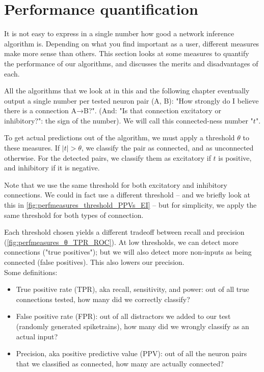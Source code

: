 \FloatBarrier
\section{Performance quantification}
\label{sec:perf_quant}

It is not easy to express in a single number how good a network inference algorithm is. Depending on what you find important as a user, different measures make more sense than others. This section looks at some measures to quantify the performance of our algorithms, and discusses the merits and disadvantages of each.

All the algorithms that we look at in this and the following chapter eventually output a single number per tested neuron pair (A, B): "How strongly do I believe there is a connection A→B?". (And: "Is that connection excitatory or inhibitory?": the sign of the number). We will call this connected-ness number "$t$".

To get actual predictions out of the algorithm,
we must apply a threshold $θ$ to these measures. If $|t| > θ$, we classify the pair as connected, and as unconnected otherwise. For the detected pairs, we classify them as excitatory if $t$ is positive, and inhibitory if it is negative.

Note that we use the same threshold for both excitatory and inhibitory connections. We could in fact use a different threshold -- and we briefly look at this in \cref{fig:perfmeasures_threshold_PPVs_EI} -- but for simplicity, we apply the same threshold for both types of connection.

Each threshold chosen yields a different tradeoff between recall and precision (\cref{fig:perfmeasures_θ_TPR_ROC}). At low thresholds, we can detect more connections ("true positives"); but we will also detect more non-inputs as being connected (false positives). This also lowers our precision.\\
Some definitions:
\begin{itemize}
    \item True positive rate (TPR), aka recall, sensitivity, and power: out of all true connections tested, how many did we correctly classify?
    \item False positive rate (FPR): out of all distractors we added to our test (randomly generated spiketrains), how many did we wrongly classify as an actual input?
    \item Precision, aka positive predictive value (PPV): out of all the neuron pairs that we classified as connected, how many are actually connected?
\end{itemize}

